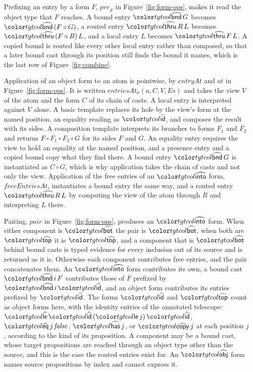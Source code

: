 Prefixing an entry by a form $F$, $\mathit{pre}_F$ in Figure~\ref{fig:form-ops}, makes it read the object type that $F$ reaches. A bound entry $\form{bnd}\,G$ becomes $\form{bnd}\,(F \circ G)$, a routed entry $\form{thru}\,R\,L$ becomes $\form{thru}\,(F \circ R)\,L$, and a local entry $L$ becomes $\form{thru}\,F\,L$. A copied bound is routed like every other local entry rather than composed, so that a later bound cast through its position still finds the bound it names, which is the last row of Figure~\ref{fig:combine}.

Application of an object form to an atom is pointwise, by $\mathit{entryAt}$ and $\mathit{at}$ in Figure~\ref{fig:form-ops}. It is written $\mathit{entriesAt}_\sigma(a,\allowbreak C,\allowbreak V,\allowbreak \mathit{Es})$ and takes the view $V$ of the atom and the form $C$ of its chain of casts. A local entry is interpreted against $V$ alone. A basic template replaces its hole by the view's form at the named position, an equality reading as $\form{id}$, and composes the result with its sides. A composition template interprets its branches to forms $F_1$ and $F_2$ and returns $F \circ F_1 \circ F_2 \circ G$ for its sides $F$ and $G$. An equality entry requires the view to hold an equality at the named position, and a presence entry and a copied bound copy what they find there. A bound entry $\form{bnd}\,G$ is instantiated as $C \circ G$, which is why application takes the chain of casts and not only the view. Application of the free entries of an $\form{into}$ form, $\mathit{freeEntriesAt}$, instantiates a bound entry the same way, and a routed entry $\form{thru}\,R\,L$ by computing the view of the atom through $R$ and interpreting $L$ there.

Pairing, $\mathit{pair}$ in Figure~\ref{fig:form-ops}, produces an $\form{into}$ form. When either component is $\form{bot}$ the pair is $\form{bot}$, when both are $\form{top}$ it is $\form{top}$, and a component that is $\form{bot}$ behind bound casts is typed evidence for every inclusion out of its source and is returned as it is. Otherwise each component contributes free entries, and the pair concatenates them. An $\form{into}$ form contributes its own, a bound cast $\form{bnd}\,i\,F$ contributes those of $F$ prefixed by $\form{bnd}\,i\,\form{id}$, and an object form contributes its entries prefixed by $\form{id}$. The forms $\form{id}$ and $\form{top}$ count as object forms here, with the identity entries of the annotated telescope: $\form{le}\,\form{id}\,(\ev{le}\,j)\,\form{id}$, $\form{eq}\,j\,\mathit{false}$, $\form{has}\,j$, or $\form{copy}\,j$ at each position $j$, according to the kind of its proposition. A component may be a bound cast, whose target propositions are reached through an object type other than the source, and this is the case the routed entries exist for. An $\form{obj}$ form names source propositions by index and cannot express it.

